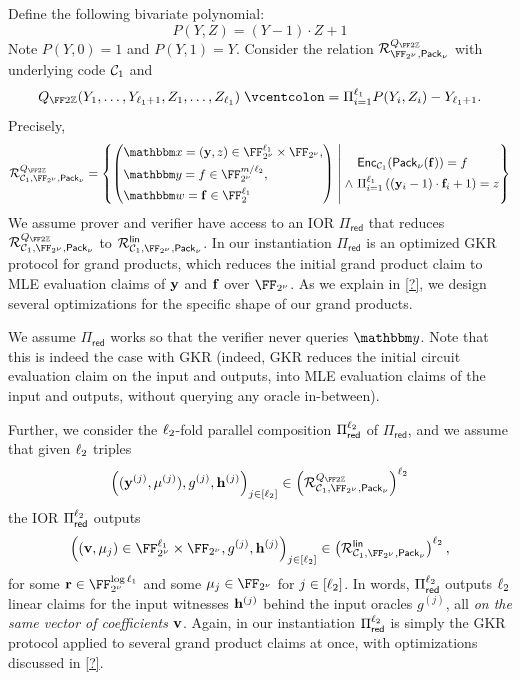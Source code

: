 \documentclass[11pt,letterpaper,usenames,dvipsnames]{article}
\begin{document}
Define the following bivariate polynomial:
$$
P(Y,Z) = (Y-1)\cdot Z +1 
$$
 Note
%
$
P(Y,0) = 1$ and $P(Y,1) = Y.
$
%
Consider the relation $\Relation_{\comfield, \pack}^{Q_{\FF2\ZZ}}$ with underlying code $\mathcal{C}_1$ and 
%
$$Q_{\FF2\ZZ}(Y_1, \ldots, Y_{\codedim_1+1}, Z_1, \ldots, Z_{\codedim_1}) \defeq \Pi_{i=1}^{\codedim_1} P(Y_i, Z_i) - Y_{\codedim_1+1}.$$ 
%
Precisely, 
%
$$
\Relation^{Q_{\FF2\ZZ}}_{\cC_1,\comfield,\pack} = \left\{ \left(\begin{aligned} &\inp=(\yy,z)\in \comfield^{\codedim_1}\times \comfield, \\&\oracle = f \in \comfield^{\codelength/\codedim_2}, \\ &\wit= \bff\in \FF_2^{\codedim_1}\end{aligned}\right) \;\middle|\;  \begin{aligned} &\Enc_{\cC_1}(\pack(\bff)) = f\\ \wedge \  &\Pi_{i=1}^{\codedim_1} \left((\yy_i-1)\cdot \bff_i +1\right) = z  \end{aligned} \right\}
$$
%
We assume prover and verifier have access to an IOR $\Pi_{\mathsf{red}}$  that reduces 
%
$
\Relation^{Q_{\FF2\ZZ}}_{\cC_1,\comfield,\pack}$ to $\Relation^{\mathsf{lin}}_{\cC_1,\comfield, \pack}$.  In our instantiation $\Pi_{\mathsf{red}}$ is an optimized GKR protocol for  grand products, which reduces the initial grand product claim to MLE evaluation claims of $\mathbf{y}$ and $\mathbf{f}$ over $\comfield$. As we explain in \cref{?}, we design several optimizations for the specific shape of our grand products.

%
%
We assume $\Pi_{\mathsf{red}}$ works so that the verifier never queries $\oracle$. Note that this is indeed the case with GKR (indeed, GKR reduces the initial circuit evaluation claim on the input and outputs, into MLE evaluation claims of the input and outputs, without querying any oracle in-between). 


Further, we consider the $\ell_2$-fold parallel composition $\Pi_{\mathsf{red}}^{\ell_2}$ of $\Pi_{\mathsf{red}}$,  and we assume that given $\ell_2$ triples 
%
$$
\left((\yy^{(j)},\mu^{(j)}) , g^{(j)}, \bfh^{(j)}  \right)_{j\in[\codedim_2]} \in \left(\Relation^{Q_{\FF2\ZZ}}_{\cC_1,\comfield,\pack}\right)^{\codedim_2}
$$
the IOR $\Pi_{\mathsf{red}}^{\ell_2}$ outputs 
%
$$
\left((\vv,\mu_j) \in \comfield^{ \codedim_1 } \times \comfield, g^{(j)} , \bfh^{(j)} \right)_{j\in[\codedim_2]} \in \left(\Relation^{\mathsf{lin}}_{\cC_1,\comfield, \pack}\right)^{\codedim_2},
$$
for some $\rr\in \comfield^{\log \codedim_1}$ and some $\mu_j\in \comfield$ for $j\in [\ell_2]$.
In words, $\Pi_{\mathsf{red}}^{\ell_2}$ outputs $\ell_2$ linear claims for the input witnesses $\mathbf{h}^{(j)}$ behind the input oracles $g^{(j)}$, all \emph{on the same vector of coefficients  $\mathbf{v}$}.  Again, in our instantiation $\Pi_{\mathsf{red}}^{\ell_2}$ is simply the GKR protocol applied to several grand product claims at once, with optimizations discussed in \cref{?}. 
\end{document}
